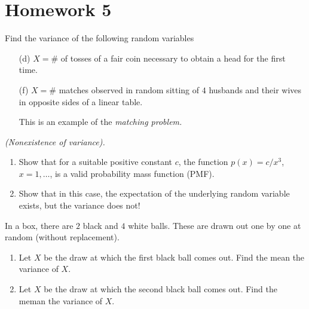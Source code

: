 \section{Homework 5}
\begin{problem}[Handout 7, \# 6(d, f)]
  Find the variance of the following random variables
  \begin{itemize}[noitemsep]
  \item[(d)] \(X=\#\) of tosses of a fair coin necessary to obtain a head
    for the first time.
  \item[(f)] \(X=\#\) matches observed in random sitting of \(4\) husbands
    and their wives in opposite sides of a linear table.

    This is an example of the \emph{matching problem.}
  \end{itemize}
\end{problem}
\begin{solution}
\end{solution}

\begin{problem}[Handout 7, \# 8]
  \emph{(Nonexistence of variance).}
  \begin{enumerate}[label=(\alph*),noitemsep]
  \item Show that for a suitable positive constant \(c\), the function
    \(p(x)=c/x^3\), \(x=1,\dots\), is a valid probability mass function
    (PMF).
  \item Show that in this case, the expectation of the underlying random
    variable exists, but the variance does not!
  \end{enumerate}
\end{problem}
\begin{solution}
\end{solution}

\begin{problem}[Handout 7, \# 9]
  In a box, there are \(2\) black and \(4\) white balls. These are drawn
  out one by one at random (without replacement).
  \begin{enumerate}[label=(\alph*),noitemsep]
  \item Let \(X\) be the draw at which the first black ball comes out. Find
    the mean the variance of \(X\).
  \item Let \(X\) be the draw at which the second black ball comes
    out. Find the meman the variance of \(X\).
  \end{enumerate}
\end{problem}
\begin{solution}
\end{solution}

